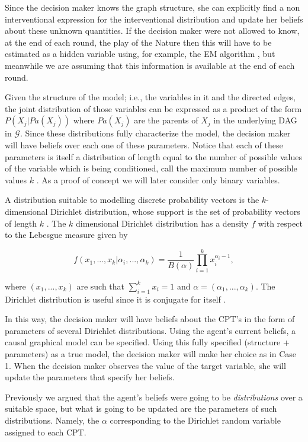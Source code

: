 \documentclass{article}
\begin{document}
Since the decision maker knows the graph structure, she can explicitly find a non interventional expression for the interventional distribution and update her beliefs about these unknown quantities. If the decision maker were not allowed to know, at the end of each round, the play of the Nature then this will have to be estimated as a hidden variable using, for example, the EM algorithm \cite{dempster1977maximum}, but meanwhile we are assuming that this information is available at the end of each round.

Given the structure of the model; i.e., the variables in it and the directed edges, the joint distribution of those variables can be expressed as a product of the form $P(X_j | Pa(X_j))$ where $Pa(X_j)$ are the parents of $X_j$ in the underlying DAG in $\mathcal{G}$. Since these distributions fully characterize the model, the decision maker will have beliefs over each one of these parameters. Notice that each of these parameters is itself a distribution of length equal to the number of possible values of the variable which is being conditioned, call the maximum number of possible values $k$ . As a proof of concept we will later consider only binary variables.

A distribution suitable to modelling discrete probability vectors is the $k$-dimensional Dirichlet distribution, whose support is the set of probability vectors of length $k$ \cite{hjort2010bayesian}. The $k$ dimensional Dirichlet distribution has a density $f$ with respect to the Lebesgue measure given by

\[ f(x_1,...,x_k | \alpha_i,...,\alpha_k)=\frac{1}{B(\alpha)}  \prod_{i=1}^k x_i^{\alpha_i-1},\]

where $(x_1,...,x_k)$ are such that $\sum_{i=1}^k x_i =1$ and $\alpha=(\alpha_1,...,\alpha_k)$. The Dirichlet distribution is useful since it is conjugate for itself \cite{bernardo2000bayesian}.

In this way, the decision maker will have beliefs about the CPT's in the form of parameters of several Dirichlet distributions. Using the agent's current beliefs, a causal graphical model can be specified. Using this fully specified (structure + parameters) as a true model, the decision maker will make her choice as in Case 1. When the decision maker observes the value of the target variable, she will update the parameters that specify her beliefs.

Previously we argued that the agent's beliefs were going to be \textit{distributions} over a suitable space, but what is going to be updated are the parameters of such distributions. Namely, the $\alpha$ corresponding to the Dirichlet random variable assigned to each CPT.
\end{document}
